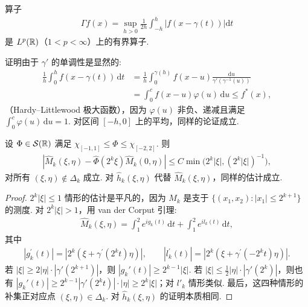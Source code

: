 \begin{lemma}\label{lem:5.24}
算子
\begin{align*}
  \Gamma f(x)=\sup_{h>0}\frac{1}{2h}\int_{-h}^{h}\left|f(x-\gamma(t))\right|\mathrm{d}t
\end{align*}
是 $L^p(\mathbb{R})$（$1 < p < \infty$）上的有界算子.
\end{lemma}

证明由于 $\gamma'$ 的单调性是显然的:
\begin{align*}
  \frac{1}{h}\int_{0}^{h}f(x-\gamma(t))\,\mathrm{d}t
  &=\frac{1}{h}\int_{0}^{\gamma(h)}f(x-u)\frac{\mathrm{d}u}{\gamma'(\gamma^{-1}(u))}\\
  &=\int_{0}^{c}f(x-u)\varphi(u)\,\mathrm{d}u\leq f^{*}(x),
\end{align*}
（Hardy--Littlewood 极大函数），因为 $\varphi(u)$ 非负、递减且满足 $\int_{0}^{c}\varphi(u)\,\mathrm{d}u = 1$. 对区间 $[-h, 0]$ 上的平均，同样的论证成立.

\begin{lemma}\label{lem:5.25}
设 $\Phi \in \mathcal{S}(\mathbb{R})$ 满足 $\chi_{[-1,1]} \leq \Phi \leq \chi_{[-2,2]}$. 则
\begin{align*}
  \left|\widehat{M}_{k}(\xi,\eta)-\widehat{\Phi}(2^{k}\xi)\widehat{M}_{k}(0,\eta)\right|
  \leq C\min\bigl(2^{k}|\xi|,(2^{k}|\xi|)^{-1}\bigr),
\end{align*}
对所有 $(\xi,\eta)\notin\Delta_{k}$ 成立. 对 $\widehat{h}_{k}(\xi,\eta)$ 代替 $\widehat{M}_{k}(\xi,\eta)$，同样的估计成立.
\end{lemma}

\begin{proof}
$2^k|\xi| \leq 1$ 情形的估计是平凡的，因为 $M_k$ 是支于 $\{(x_1, x_2) : |x_1| \leq 2^{k+1}\}$ 的测度. 对 $2^k|\xi| > 1$，用 van der Corput 引理:
\begin{align*}
  \widehat{M}_{k}(\xi,\eta)=\int_{1}^{2}e^{i g_{k}(t)}\,\mathrm{d}t+\int_{1}^{2}e^{i l_{k}(t)}\,\mathrm{d}t,
\end{align*}
其中
\begin{align*}
  |g_{k}^{\prime}(t)|=|2^{k}(\xi+\gamma^{\prime}(2^{k}t)\eta)|,\qquad
  |l_{k}^{\prime}(t)|=|2^{k}(\xi+\gamma^{\prime}(-2^{k}t)\eta)|.
\end{align*}
若 $|\xi| \geq 2|\eta|\cdot|\gamma'(2^{k+1})|$，则 $|g_k'(t)| \geq 2^{k-1}|\xi|$. 若 $|\xi| \leq \frac{1}{2}|\eta|\cdot|\gamma'(2^k)|$，则也有 $|g_k'(t)| \geq 2^{k-1}|\gamma'(2^k t)|\cdot|\eta| \geq 2^k|\xi|$；对 $l'_k$ 情形类似. 最后，这四种情形的补集正对应点 $(\xi, \eta) \in \Delta_k$. 对 $\widehat{h}_k(\xi, \eta)$ 的证明本质相同.
\end{proof}

